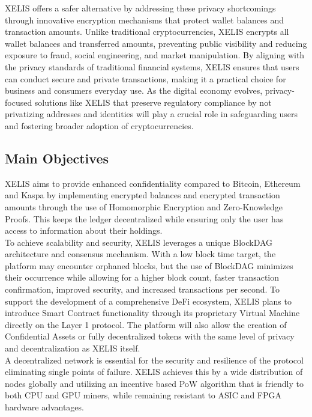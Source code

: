 \documentclass[10pt,a4paper,twocolumn]{article}
\begin{document}
XELIS offers a safer alternative by addressing these privacy shortcomings through innovative encryption mechanisms that protect wallet balances and transaction amounts. Unlike traditional cryptocurrencies, XELIS encrypts all wallet balances and transferred amounts, preventing public visibility and reducing exposure to fraud, social engineering, and market manipulation. By aligning with the privacy standards of traditional financial systems, XELIS ensures that users can conduct secure and private transactions, making it a practical choice for business and consumers everyday use. As the digital economy evolves, privacy-focused solutions like XELIS that preserve regulatory compliance by not privatizing addresses and identities will play a crucial role in safeguarding users and fostering broader adoption of cryptocurrencies.

\subsection{Main Objectives}

XELIS aims to provide enhanced confidentiality compared to Bitcoin, Ethereum and Kaspa by implementing encrypted balances and encrypted transaction amounts through the use of Homomorphic Encryption and Zero-Knowledge Proofs. This keeps the ledger decentralized while ensuring only the user has access to information about their holdings.\\

To achieve scalability and security, XELIS leverages a unique BlockDAG architecture and consensus mechanism. With a low block time target, the platform may encounter orphaned blocks, but the use of BlockDAG minimizes their occurrence while allowing for a higher block count, faster transaction confirmation, improved security, and increased transactions per second. To support the development of a comprehensive DeFi ecosystem, XELIS plans to introduce Smart Contract functionality through its proprietary Virtual Machine directly on the Layer 1 protocol. The platform will also allow the creation of Confidential Assets or fully decentralized tokens with the same level of privacy and decentralization as XELIS itself.\\

A decentralized network is essential for the security and resilience of the protocol eliminating single points of failure. XELIS achieves this by a wide distribution of nodes globally and utilizing an incentive based PoW algorithm that is friendly to both CPU and GPU miners, while remaining resistant to ASIC and FPGA hardware advantages.\\
\end{document}
